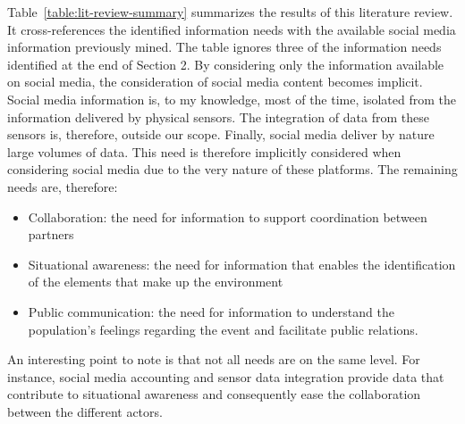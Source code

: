 Table~\ref{table:lit-review-summary} summarizes the results of this literature review.
It cross-references the identified information needs with the available social media information previously mined.
The table ignores three of the information needs identified at the end of Section 2.
By considering only the information available on social media, the consideration of social media content becomes implicit.
Social media information is, to my knowledge, most of the time, isolated from the information delivered by physical sensors.
The integration of data from these sensors is, therefore, outside our scope.
Finally, social media deliver by nature large volumes of data.
This need is therefore implicitly considered when considering social media due to the very nature of these platforms.
The remaining needs are, therefore:

\begin{itemize}
    \item Collaboration: the need for information to support coordination between partners
    \item Situational awareness: the need for information that enables the identification of the elements that make up the environment
    \item Public communication: the need for information to understand the population's feelings regarding the event and facilitate public relations.
\end{itemize}

An interesting point to note is that not all needs are on the same level.
For instance, social media accounting and sensor data integration provide data that contribute to situational awareness and consequently ease the collaboration between the different actors.

